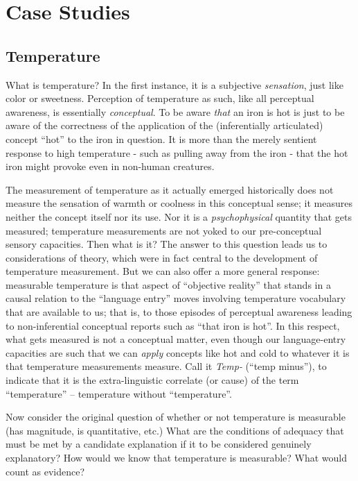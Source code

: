 \documentclass[11pt,twoside]{article}
\begin{document}
\clearpage
\section{Case Studies}

\subsection{Temperature}

What is temperature?  In the first instance, it is a subjective
\textit{sensation}, just like color or sweetness.  Perception of
temperature as such, like all perceptual awareness, is essentially
\textit{conceptual}.  To be aware \textit{that} an iron is hot is just
to be aware of the correctness of the application of the
(inferentially articulated) concept ``hot'' to the iron in question.
It is more than the merely sentient response to high temperature -
such as pulling away from the iron - that the hot iron might provoke
even in non-human creatures.

The measurement of temperature as it actually emerged historically
does not measure the sensation of warmth or coolness in this
conceptual sense; it measures neither the concept itself nor its use.
Nor it is a \textit{psychophysical} quantity that gets measured;
temperature measurements are not yoked to our pre-conceptual sensory
capacities.  Then what is it?  The answer to this question leads us to
considerations of theory, which were in fact central to the
development of temperature measurement.  But we can also offer a more
general response: measurable temperature is that aspect of ``objective
reality'' that stands in a causal relation to the ``language entry''
moves involving temperature vocabulary that are available to us; that
is, to those episodes of perceptual awareness leading to
non-inferential conceptual reports such as ``that iron is hot''.  In
this respect, what gets measured is not a conceptual matter, even
though our language-entry capacities are such that we can
\textit{apply} concepts like hot and cold to whatever it is that
temperature measurements measure.  Call it \textit{Temp-} (``temp
minus''), to indicate that it is the extra-linguistic correlate (or
cause) of the term ``temperature'' -- temperature without
``temperature''.


Now consider the original question of whether or not temperature is
measurable (has magnitude, is quantitative, etc.)  What are the
conditions of adequacy that must be met by a candidate explanation if
it to be considered genuinely explanatory?  How would we know that
temperature is measurable?  What would count as evidence?
\end{document}
